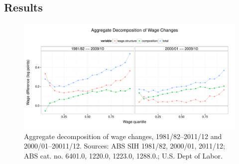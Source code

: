 \subsection{Results}


\begin{figure}
  \centering
  \includegraphics[width=\textwidth]{../figure/aggregate_decomp.pdf}
  \caption{Aggregate decomposition of wage changes, 1981/82--2011/12 and 2000/01--20011/12. Sources: ABS SIH 1981/82, 2000/01, 2011/12; ABS cat. no. 6401.0, 1220.0, 1223.0, 1288.0.; U.S. Dept of Labor.}
  \label{fig:aggregate}
\end{figure}

